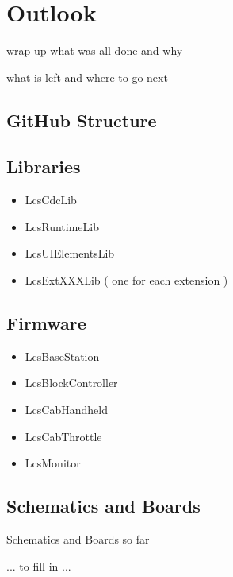 \chapter{Outlook}

wrap up what was all done and why

what is left and where to go next

\section{GitHub Structure}

\section{Libraries}

\begin{itemize}
\item LcsCdcLib
\item LcsRuntimeLib
\item LcsUIElementsLib
\item LcsExtXXXLib ( one for each extension )
\end{itemize}

\section{Firmware}

\begin{itemize}
\item LcsBaseStation
\item LcsBlockController
\item LcsCabHandheld
\item LcsCabThrottle
\item LcsMonitor
\end{itemize}

\section{Schematics and Boards}

Schematics and Boards so far

... to fill in ...
